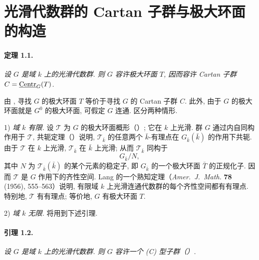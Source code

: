 


\setcounter{footnote}{0}

\section{光滑代数群的 Cartan 子群与极大环面的构造}

\paragraph{\textbf{定理 1.1.}}
\emph{设 \(G\) 是域 \(k\) 上的光滑代数群. 则 \(G\) 容许极大环面 \(T\), 因而容许 Cartan 子群 \(C=\underline{\operatorname{Centr}}_G(T)\).}

由 , 寻找 \(G\) 的极大环面 \(T\) 等价于寻找 \(G\) 的 Cartan 子群 \(C\). 此外, 由于 \(G\) 的极大环面就是 \(G^0\) 的极大环面, 可假定 \(G\) 连通. 区分两种情形.

\medskip
\noindent\textup{1\textdegree)} \emph{域 \(k\) 有限.}
设 \(\mathcal T\) 为 \(G\) 的极大环面概形（）; 它在 \(k\) 上光滑. 群 \(G\) 通过内自同构作用于 \(\mathcal T\), 共轭定理（）说明, \(\mathcal T_{\bar k}\) 的任意两个 \(\bar k\)-有理点在 \(G_{\bar k}(\bar k)\) 的作用下共轭. 由于 \(\mathcal T\) 在 \(k\) 上光滑, \(\mathcal T_{\bar k}\) 在 \(\bar k\) 上光滑; 从而 \(\mathcal T_{\bar k}\) 同构于
\[
  G_{\bar k}/N,
\]
其中 \(N\) 为 \(\mathcal T_{\bar k}(\bar k)\) 的某个元素的稳定子, 即 \(G_{\bar k}\) 的一个极大环面 \(\bar T\) 的正规化子. 因而 \(\mathcal T\) 是 \(G\) 作用下的齐性空间. Lang 的一个熟知定理（\emph{Amer.\ J.\ Math.} \textbf{78} (1956), 555--563）说明, 有限域 \(k\) 上光滑连通代数群的每个齐性空间都有有理点. 特别地, \(\mathcal T\) 有有理点; 等价地, \(G\) 有极大环面 \(T\).

\medskip
\noindent\textup{2\textdegree)} \emph{域 \(k\) 无限.}
将用到下述引理.

\paragraph{\textbf{引理 1.2.}}
\emph{设 \(G\) 是域 \(k\) 上的光滑代数群. 则 \(G\) 容许一个 \textup{(C)} 型子群\textup{（）}.}

